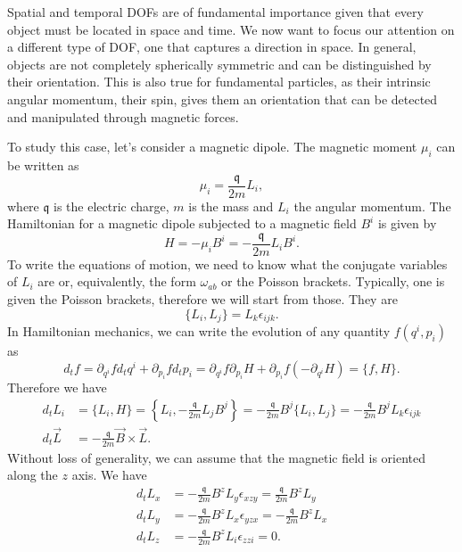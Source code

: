 Spatial and temporal DOFs are of fundamental importance given that every object must be located in space and time. We now want to focus our attention on a different type of DOF, one that captures a direction in space. In general, objects are not completely spherically symmetric and can be distinguished by their orientation. This is also true for fundamental particles, as their intrinsic angular momentum, their spin, gives them an orientation that can be detected and manipulated through magnetic forces.

To study this case, let's consider a magnetic dipole. The magnetic moment $\mu_i$ can be written as
\begin{equation}
	\mu_i = \frac{\mathfrak{q}}{2m} L_i,
\end{equation}
where $\mathfrak{q}$ is the electric charge, $m$ is the mass and $L_i$ the angular momentum. The Hamiltonian for a magnetic dipole subjected to a magnetic field $B^i$ is given by
\begin{equation}
	H = - \mu_i B^i = - \frac{\mathfrak{q}}{2m} L_i B^i.
\end{equation}
To write the equations of motion, we need to know what the conjugate variables of $L_i$ are or, equivalently, the form $\omega_{ab}$ or the Poisson brackets. Typically, one is given the Poisson brackets, therefore we will start from those. They are
\begin{equation}
	\{L_i, L_j\} = L_k \epsilon_{ijk}.
\end{equation}
In Hamiltonian mechanics, we can write the evolution of any quantity $f(q^i, p_i)$ as
\begin{equation}
	d_t f = \partial_{q^i} f d_t q^i + \partial_{p_i} f d_t p_i = \partial_{q^i} f \partial_{p_i} H + \partial_{p_i} f (-\partial_{q^i} H) = \{f, H\}.
\end{equation}
Therefore we have
\begin{equation}
	\begin{aligned}
	d_t L_i &= \{L_i, H\} = \left\{ L_i, - \frac{\mathfrak{q}}{2m} L_j B^j \right\}  = - \frac{\mathfrak{q}}{2m} B^j\{L_i, L_j\} = - \frac{\mathfrak{q}}{2m} B^j L_k \epsilon_{ijk}\\
	d_t \vec{L} &= - \frac{\mathfrak{q}}{2m} \vec{B} \times \vec{L} .
	\end{aligned}
\end{equation}
Without loss of generality, we can assume that the magnetic field is oriented along the $z$ axis. We have
\begin{equation}
	\begin{aligned}
		d_t L_x &= - \frac{\mathfrak{q}}{2m} B^z L_y \epsilon_{xzy} = \frac{\mathfrak{q}}{2m} B^z L_y \\
		d_t L_y &= - \frac{\mathfrak{q}}{2m} B^z L_x \epsilon_{yzx} = - \frac{\mathfrak{q}}{2m} B^z L_x \\
		d_t L_z &= - \frac{\mathfrak{q}}{2m} B^z L_i \epsilon_{zzi} = 0.
	\end{aligned}
\end{equation}
